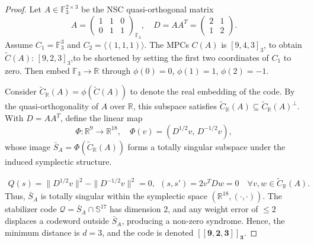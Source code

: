 \documentclass[10pt,a4paper]{amsart}
\begin{document}
\begin{proof}
Let $A \in \mathbb{F}_3^{2 \times 3}$ be the NSC quasi-orthogonal matrix
\begin{equation}
A = \begin{pmatrix} 1 & 1 & 0 \\ 0 & 1 & 1 \end{pmatrix}_{\mathbb{F}_3}, \quad
D=AA^T = \begin{pmatrix} 2 & 1 \\ 1 & 2 \end{pmatrix}.\label{matrix}\end{equation}
Assume $C_1 = \mathbb{F}_3^3$ and $C_2 = \langle (1,1,1) \rangle$.  The MPCs $C(A)$ is $[9,4,3]_3$, to obtain $\tilde{C}(A)$: $[9,2,3]_3$,to be  shortened by setting the first two coordinates of $C_1$ to zero. Then embed $\mathbb{F}_3 \to \mathbb{R}$ through $\phi(0)=0$, $\phi(1)=1$, $\phi(2)=-1$. 

Consider $\tilde{C}_{\mathbb{R}}(A) = \phi(\tilde{C}(A))$ to denote the real embedding of the code. By the quasi-orthogonality of $A$ over $\mathbb{R}$, this subspace satisfies 
$\tilde{C}_{\mathbb{R}}(A) \subseteq \tilde{C}_{\mathbb{R}}(A)^{\perp}$. 
With $D = AA^T$, define the linear map
\begin{equation}
\Phi: \mathbb{R}^9 \rightarrow \mathbb{R}^{18}, \quad 
\Phi(v) = (D^{1/2}v,\, D^{-1/2}v),\label{phi v}
\end{equation}
whose image $\bar{S}_A = \Phi(\tilde{C}_{\mathbb{R}}(A))$ 
forms a totally singular subspace under the induced symplectic structure.

\begin{equation}
\begin{aligned}
Q(s) = \|D^{1/2} v\|^2 - \|D^{-1/2} v\|^2 = 0, ~~(s,s') = 2 v^T D w = 0 \quad \forall v,w \in \tilde{C}_{\mathbb{R}}(A).
\end{aligned}
\end{equation}
Thus, $\bar{S}_A$ is totally singular within the symplectic space 
$(\mathbb{R}^{18}, (\cdot,\cdot))$. 
The stabilizer code $\mathcal{Q} = \bar{S}_A \cap \mathbb{S}^{17}$ 
has dimension $2$, and any weight error of $\leq 2$ 
displaces a codeword outside $\bar{S}_A$, producing a non-zero syndrome. Hence, the minimum distance is $d=3$, and the code is denoted 
$\mathbf{[[9,2,3]]_3}$.
\end{proof}
\end{document}
